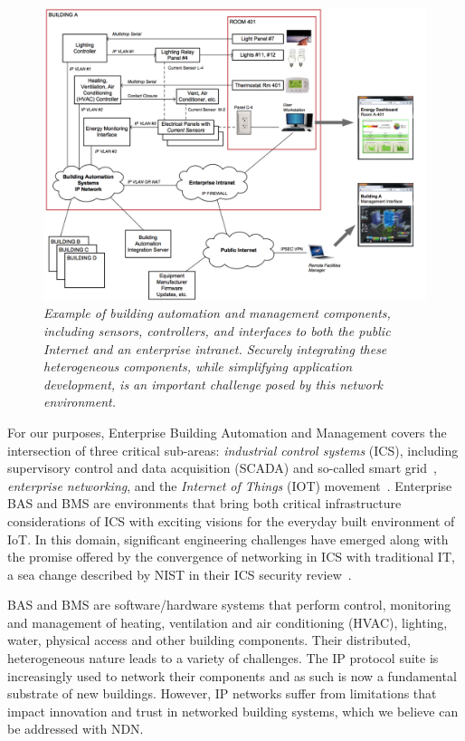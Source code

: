 \begin{figure}
\vskip -12pt
\includegraphics[width=.6\textwidth]{figures/BAS-Figure}
\vskip -5pt
\caption{{\em \small Example of building automation and management components, including sensors, controllers, and interfaces to both the public Internet and an enterprise intranet.  Securely integrating these heterogeneous components, while simplifying application development, is an important challenge posed by this network environment.}}
\label{fig:BAS}
\end{figure}

For our purposes, Enterprise Building Automation and Management covers the intersection of three critical sub-areas: \emph{industrial control systems} (ICS), including supervisory control and data acquisition (SCADA) and so-called smart grid~\cite{fang2011smart}, \emph{enterprise networking}, and the \emph{Internet of Things} (IOT) movement~\cite{atzori2010internet}. Enterprise BAS and BMS are environments that bring both critical infrastructure considerations of ICS with exciting visions for the everyday built environment of IoT.  In this domain, significant engineering challenges have emerged along with the promise offered by the convergence of networking in ICS with traditional IT, a sea change described by NIST in their ICS security review~\cite{NIST_ICS}.  

BAS and BMS are software/hardware systems that perform control, monitoring and management of heating, ventilation and air conditioning (HVAC), lighting, water, physical access and other building components. Their distributed, heterogeneous nature leads to a variety of challenges.  The IP protocol suite is increasingly used to network their components and as such is now a fundamental substrate of new buildings. However, IP networks suffer from limitations that impact innovation and trust in networked building systems, which we believe can be addressed with NDN.    
 
